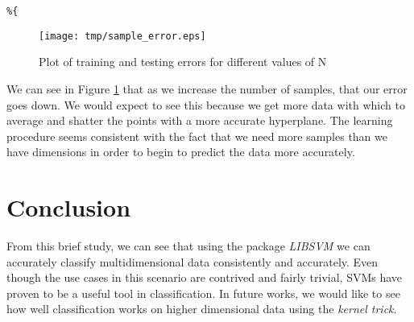 \documentclass[11pt, twoside]{article}   	%
\begin{document}
\begin{itemize}
\begin{lstlisting}
%{
\end{lstlisting}

\begin{figure}[h]
\centering
\texttt{[image: tmp/sample\_error.eps]}
\caption{Plot of training and testing errors for different values of N}
\label{fig:n_errors} 
\end{figure}

We can see in Figure \ref{fig:n_errors} that as we increase the number of
samples, that our error goes down. We would expect to see this because we
get more data with which to average and shatter the points with a more
accurate hyperplane. The learning procedure seems consistent with the fact
that we need more samples than we have dimensions in order to begin to
predict the data more accurately. 

\end{itemize}

\section{Conclusion}
From this brief study, we can see that using the package \textit{LIBSVM} we can accurately classify multidimensional 
data consistently and accurately. Even though the use cases in this scenario are contrived and fairly trivial, SVMs
have proven to be a useful tool in classification. In future works, we would like to see how well classification works on 
higher dimensional data using the \textit{kernel trick}.
\end{document}
